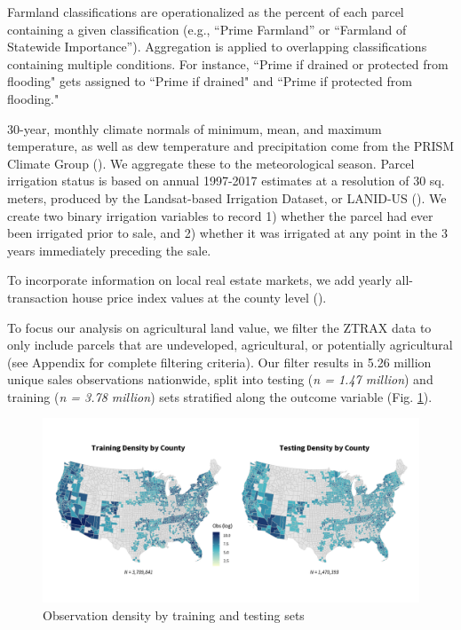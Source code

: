\documentclass[12pt]{article}
\begin{document}
Farmland classifications are operationalized as the percent of each parcel containing a given classification (e.g., ``Prime Farmland” or ``Farmland of Statewide Importance”). Aggregation is applied to overlapping classifications containing multiple conditions. For instance, ``Prime if drained or protected from flooding" gets assigned to ``Prime if drained" and ``Prime if protected from flooding." 

30-year, monthly climate normals of minimum, mean, and maximum temperature, as well as dew temperature and precipitation come from the PRISM Climate Group (\cite{PRISMClimate2021}). We aggregate these to the meteorological season. Parcel irrigation status is based on annual 1997-2017 estimates at a resolution of 30 sq. meters, produced by the Landsat-based Irrigation Dataset, or LANID-US (\cite{Xie2021MappingStates}). We create two binary irrigation variables to record 1) whether the parcel had ever been irrigated prior to sale, and 2) whether it was irrigated at any point in the 3 years immediately preceding the sale. 

To incorporate information on local real estate markets, we add yearly all-transaction house price index values at the county level (\cite{FederalHousing2022}).

To focus our analysis on agricultural land value, we filter the ZTRAX data to only include parcels that are undeveloped, agricultural, or potentially agricultural (see Appendix for complete filtering criteria).
Our filter results in 5.26 million unique sales observations nationwide, split into testing (\textit{n = 1.47 million}) and training (\textit{n = 3.78 million}) sets stratified along the outcome variable (Fig. \ref{fig:train_test}).

\begin{figure}
    \centering
    \includegraphics[width=6in]{figures/test_train_density.png}
    \caption{Observation density by training and testing sets}
    \label{fig:train_test}
\end{figure}
\end{document}
